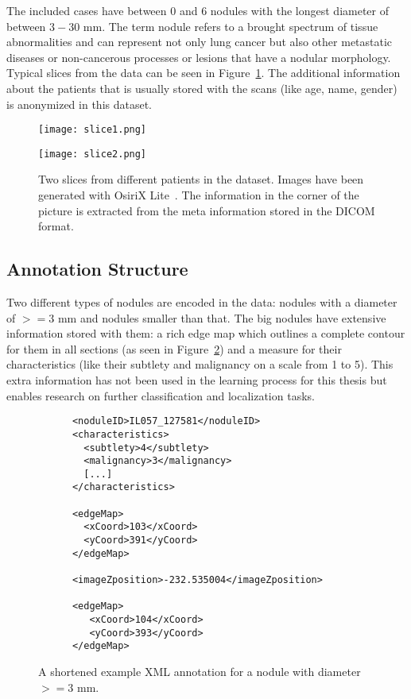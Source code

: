 \documentclass[../Thesis.tex]{subfiles}
\begin{document}
The included cases have between $0$ and $6$ nodules with the longest diameter of between $3-30$ mm. The term nodule refers to a brought spectrum of tissue abnormalities and can represent not only lung cancer but also other metastatic diseases or non-cancerous processes or lesions that have a nodular morphology. Typical slices from the data can be seen in Figure~\ref{fig:slices}. The additional information about the patients that is usually stored with the scans (like age, name, gender) is anonymized in this dataset.


\begin{figure}[!tbp]
\centering
\begin{minipage}[b]{0.7\textwidth}
	\texttt{[image: slice1.png]}
\end{minipage}
\begin{minipage}[b]{0.7\textwidth}
	\texttt{[image: slice2.png]}
\end{minipage}
\caption{Two slices from different patients in the dataset. Images have been generated with OsiriX Lite~\cite{rosset2004osirix}. The information in the corner of the picture is extracted from the meta information stored in the DICOM format.}
\label{fig:slices}
\end{figure}


\subsection{Annotation Structure}
Two different types of nodules are encoded in the data: nodules with a diameter of $>=3$ mm and nodules smaller than that. The big nodules have extensive information stored with them: a rich edge map which outlines a complete contour for them in all sections (as seen in Figure~\ref{fig:bigNod}) and a measure for their characteristics (like their subtlety and malignancy on a scale from 1 to 5). This extra information has not been used in the learning process for this thesis but enables research on further classification and localization tasks.

\begin{figure}
\begin{lstlisting}
      <noduleID>IL057_127581</noduleID>
      <characteristics>
        <subtlety>4</subtlety>
        <malignancy>3</malignancy>
        [...]
      </characteristics>
      
      <edgeMap>
        <xCoord>103</xCoord>
        <yCoord>391</yCoord>
      </edgeMap>
 
      <imageZposition>-232.535004</imageZposition>
       
      <edgeMap>
         <xCoord>104</xCoord>
         <yCoord>393</yCoord>
      </edgeMap>
\end{lstlisting}
\caption{A shortened example XML annotation for a nodule with diameter $>=3$ mm.}
\label{fig:bigNod}
\end{figure}
\end{document}
